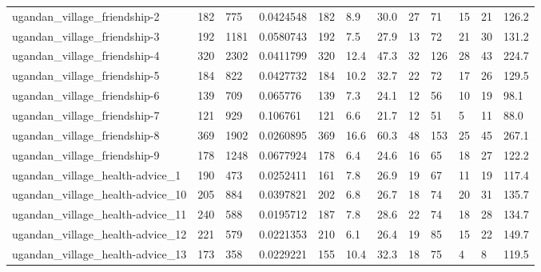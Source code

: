 \begin{longtable}{llllllllllll}
 ugandan\_village\_friendship-2                       & 182        & 775       & 0.0424548   & 182   & 8.9    & 30.0   & 27    & 71     & 15     & 21     & 126.2   \\
 ugandan\_village\_friendship-3                       & 192        & 1181      & 0.0580743   & 192   & 7.5    & 27.9   & 13    & 72     & 21     & 30     & 131.2   \\
 ugandan\_village\_friendship-4                       & 320        & 2302      & 0.0411799   & 320   & 12.4   & 47.3   & 32    & 126    & 28     & 43     & 224.7   \\
 ugandan\_village\_friendship-5                       & 184        & 822       & 0.0427732   & 184   & 10.2   & 32.7   & 22    & 72     & 17     & 26     & 129.5   \\
 ugandan\_village\_friendship-6                       & 139        & 709       & 0.065776    & 139   & 7.3    & 24.1   & 12    & 56     & 10     & 19     & 98.1    \\
 ugandan\_village\_friendship-7                       & 121        & 929       & 0.106761    & 121   & 6.6    & 21.7   & 12    & 51     & 5      & 11     & 88.0    \\
 ugandan\_village\_friendship-8                       & 369        & 1902      & 0.0260895   & 369   & 16.6   & 60.3   & 48    & 153    & 25     & 45     & 267.1   \\
 ugandan\_village\_friendship-9                       & 178        & 1248      & 0.0677924   & 178   & 6.4    & 24.6   & 16    & 65     & 18     & 27     & 122.2   \\
 ugandan\_village\_health-advice\_1                    & 190        & 473       & 0.0252411   & 161   & 7.8    & 26.9   & 19    & 67     & 11     & 19     & 117.4   \\
 ugandan\_village\_health-advice\_10                   & 205        & 884       & 0.0397821   & 202   & 6.8    & 26.7   & 18    & 74     & 20     & 31     & 135.7   \\
 ugandan\_village\_health-advice\_11                   & 240        & 588       & 0.0195712   & 187   & 7.8    & 28.6   & 22    & 74     & 18     & 28     & 134.7   \\
 ugandan\_village\_health-advice\_12                   & 221        & 579       & 0.0221353   & 210   & 6.1    & 26.4   & 19    & 85     & 15     & 22     & 149.7   \\
 ugandan\_village\_health-advice\_13                   & 173        & 358       & 0.0229221   & 155   & 10.4   & 32.3   & 18    & 75     & 4      & 8      & 119.5   \\

\end{longtable}
